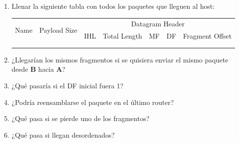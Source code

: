 \begin{enumerate}
    \item Llenar la siguiente tabla con todos los paquetes que lleguen al host:

    \begin{table}[H]
    \centering
    \renewcommand{\arraystretch}{1.5}
    \begin{tabular}{|c|c|crrrr|}
    \hline
    \multirow{2}{*}{Name} & \multirow{2}{*}{Payload Size} & \multicolumn{5}{c|}{Datagram Header} \\ \cline{3-7} 
     &  & \multicolumn{1}{c|}{IHL} & \multicolumn{1}{c|}{Total Length} &  \multicolumn{1}{c|}{MF} & \multicolumn{1}{c|}{DF} & \multicolumn{1}{c|}{Fragment Offset} \\ \hline
    \multicolumn{1}{|r|}{} & \multicolumn{1}{r|}{} & \multicolumn{1}{r|}{} & \multicolumn{1}{r|}{} & \multicolumn{1}{r|}{} & \multicolumn{1}{r|}{} &  \\ \hline
    \multicolumn{1}{|r|}{} & \multicolumn{1}{r|}{} & \multicolumn{1}{r|}{} & \multicolumn{1}{r|}{} & \multicolumn{1}{r|}{} & \multicolumn{1}{r|}{} &  \\ \hline
    \end{tabular}
    \end{table}

    \item ¿Llegarían los mismos fragmentos si se quisiera enviar el mismo paquete desde \textbf{B} hacia \textbf{A}?
    
    \item ¿Qué pasaría si el DF inicial fuera 1?
    
    \item ¿Podría reensamblarse el paquete en el último router?
    
    \item ¿Qué pasa si se pierde uno de los fragmentos?
    
    \item ¿Qué pasa si llegan desordenados?
\end{enumerate}
